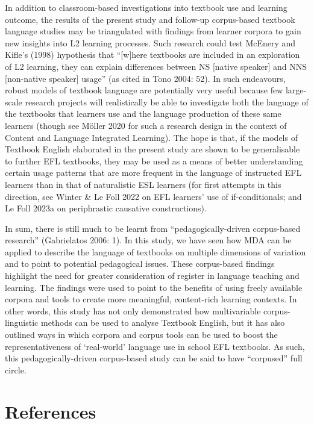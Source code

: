 \documentclass[
  letterpaper,
  DIV=11,
  numbers=noendperiod]{scrreprt}
\begin{document}
In addition to classroom-based investigations into textbook use and
learning outcome, the results of the present study and follow-up
corpus-based textbook language studies may be triangulated with findings
from learner corpora to gain new insights into L2 learning processes.
Such research could test McEnery and Kifle's (1998) hypothesis that
``{[}w{]}here textbooks are included in an exploration of L2 learning,
they can explain differences between NS {[}native speaker{]} and NNS
{[}non-native speaker{]} usage'' (as cited in Tono 2004: 52). In such
endeavours, robust models of textbook language are potentially very
useful because few large-scale research projects will realistically be
able to investigate both the language of the textbooks that learners use
and the language production of these same learners (though see Möller
2020 for such a research design in the context of Content and Language
Integrated Learning). The hope is that, if the models of Textbook
English elaborated in the present study are shown to be generalisable to
further EFL textbooks, they may be used as a means of better
understanding certain usage patterns that are more frequent in the
language of instructed EFL learners than in that of naturalistic ESL
learners (for first attempts in this direction, see Winter \& Le Foll
2022 on EFL learners' use of if-conditionals; and Le Foll 2023a on
periphrastic causative constructions).

In sum, there is still much to be learnt from ``pedagogically-driven
corpus-based research'' (Gabrielatos 2006: 1). In this study, we have
seen how MDA can be applied to describe the language of textbooks on
multiple dimensions of variation and to point to potential pedagogical
issues. These corpus-based findings highlight the need for greater
consideration of register in language teaching and learning. The
findings were used to point to the benefits of using freely available
corpora and tools to create more meaningful, content-rich learning
contexts. In other words, this study has not only demonstrated how
multivariable corpus-linguistic methods can be used to analyse Textbook
English, but it has also outlined ways in which corpora and corpus tools
can be used to boost the representativeness of `real-world' language use
in school EFL textbooks. As such, this pedagogically-driven corpus-based
study can be said to have ``corpused'' full circle.


\chapter*{References}\label{references}
\end{document}
